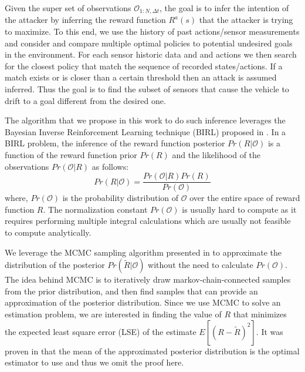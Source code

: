 \documentclass[letterpaper, 10 pt, conference]{ieeeconf}  %
\begin{document}
Given the super set of observations $\mathcal{\mathcal{O}}_{1:N,\Delta t}$, the goal is to infer the intention of the attacker by inferring the reward function $R^a (s)$ that the attacker is trying to maximize. To this end, we use the history of past actions/sensor measurements and consider and compare multiple optimal policies to potential undesired goals in the environment. For each sensor historic data and and actions we then search for the closest policy that match the sequence of recorded states/actions. If a match exists or is closer than a certain threshold then an attack is assumed inferred. Thus the goal is to find the subset of sensors that cause the vehicle to drift to a goal different from the desired one.




The algorithm that we propose in this work to do such inference leverages the Bayesian Inverse Reinforcement Learning technique (BIRL) proposed in \cite{ramachandran2007bayesian}. In a BIRL problem, the inference of the reward function posterior $Pr(R|\mathcal{O})$ is a function of the reward function prior $Pr(R)$ and the likelihood of the observations $Pr(\mathcal{O}|R)$ as follows:
\begin{equation} 
    Pr(R|\mathcal{O}) = \frac{Pr(\mathcal{O}|R)Pr(R)}{Pr(\mathcal{O})}
\end{equation}
where, $Pr(\mathcal{O})$ is the probability distribution of $\mathcal{O}$ over the entire space of reward function $R$. The normalization constant $Pr(\mathcal{O})$ is usually hard to compute as it requires performing multiple integral calculations which are usually not feasible to compute analytically. 

We leverage the MCMC sampling algorithm presented in \cite{andrieu2003introduction} to approximate the distribution of the posterior $Pr(\tilde{R}|\mathcal{O})$ without the need to calculate $Pr(\mathcal{O})$. The idea behind MCMC is to iteratively draw markov-chain-connected samples from the prior distribution, and then find samples that can provide an approximation of the posterior distribution. Since we use MCMC to solve an estimation problem, we are interested in finding the value of $R$ that minimizes the expected least square error (LSE) of the estimate $E[(R-\tilde{R})^2]$. It was proven in \cite{ramachandran2007bayesian} that the mean of the approximated posterior distribution is the optimal estimator to use and thus we omit the proof here.
\end{document}
